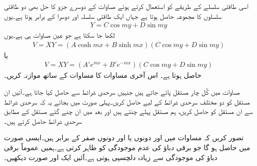 اسی طاقتی سلسلے کے طریقے کو استعمال کرتے ہوئے مساوات  کے دوسرے جزو کا حل بھی دو طاقتی سلسلوں کا مجموعہ حاصل ہوتا ہے جہاں ایک طاقتی سلسلہ  اور دوسرا  کے برابر ہوتا ہے۔یوں
\begin{align}\label{مساوات_لاپلاس_طاقتی_حل_دو_درجی_کارتیسی}
Y=C\cos my+D\sin my
\end{align}
لکھا جا سکتا ہے جو عین مساوات  ہی ہے۔یوں
\begin{align}\label{مساوات_لاپلاس_اندازہ_ت}
V=XY=\left( A \cosh mx+B \sinh mx\right) \left(C \cos m y+D \sin m y \right)
\end{align}
یا 
\begin{align}\label{مساوات_لاپلاس_اندازہ_ٹ}
V=XY=\left(A' e^{mx}+B' e^{-m x} \right) \left(C \cos m y+D \sin m y \right)
\end{align}
حاصل ہوتا ہے۔ اس آخری مساوات کا مساوات  کے ساتھ موازنہ کریں۔

مساوات  میں کُل چار مستقل پائے جاتے ہیں جنہیں سرحدی شرائط سے حاصل کیا جاتا ہے۔آئیں ان مستقل کو دو مختلف سرحدی شرائط کے لیے حاصل کریں۔پہلی صورت میں بجائے یہ کہ سرحدی شرائط سے ان مستقل کو حاصل کریں، ہم مستقل پہلے چنتے ہیں اور بعد میں ان چنے گئے مستقل کے مطابق سرحدی شرائط حاصل کرتے ہیں۔

تصور کریں کہ مساوات  میں  اور  دونوں یا  اور  دونوں صفر کے برابر ہیں۔ایسی صورت میں  حاصل ہو گا جو برقی دباؤ کی عدم موجودگی کو ظاہر کرتی ہے۔ہمیں عموماً برقی دباؤ کی موجودگی سے زیادہ دلچسپی ہوتی ہے۔آئیں ایک اور صورت دیکھیں۔

